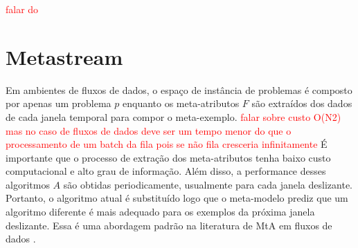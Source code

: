 \textcolor{red}{falar do \cite{talagala2018meta}}

\section{Metastream}
\label{sec:metastream}


Em ambientes de fluxos de dados, o espaço de instância de problemas é composto
por apenas um problema $p$ enquanto os meta-atributos $F$ são extraídos dos
dados de cada janela temporal para compor o meta-exemplo.
\textcolor{red}{falar sobre custo O(N2) mas no caso de fluxos de dados deve ser
um tempo menor do que o processamento de um batch da fila pois se não fila
cresceria infinitamente}
É importante que o processo de extração dos meta-atributos tenha baixo custo
computacional e alto grau de informação.
Além disso, a  performance desses algoritmos $A$ são obtidas periodicamente,
usualmente para cada janela deslizante.
Portanto, o algoritmo atual é substituído logo que o meta-modelo prediz que um
algoritmo diferente é mais adequado para os exemplos da próxima janela
deslizante.
Essa é uma abordagem padrão na literatura de MtA em fluxos de dados
\cite{read2012batch, vanrijn2014algorithm, Anderson2019}.

